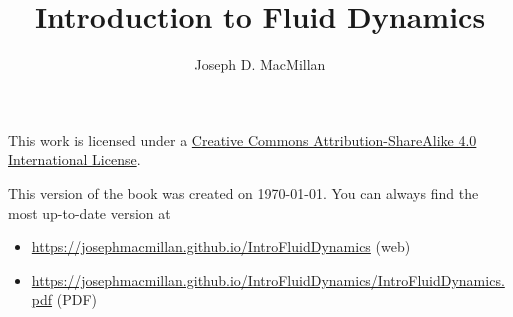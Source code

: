 \documentclass[10pt]{book}
\title{Introduction to Fluid Dynamics}
\author{Joseph D. MacMillan}
\date{}
\begin{document}
\maketitle

This work is licensed under a \href{https://creativecommons.org/licenses/by-sa/4.0/}{Creative Commons Attribution-ShareAlike 4.0 International License}.

\vspace{1in}

This version of the book was created on \today. You can always find the most up-to-date version at 
\begin{itemize}
\item \url{https://josephmacmillan.github.io/IntroFluidDynamics} (web)
\item \url{https://josephmacmillan.github.io/IntroFluidDynamics/IntroFluidDynamics.pdf} (PDF)
\end{itemize}


\tableofcontents






\end{document}
